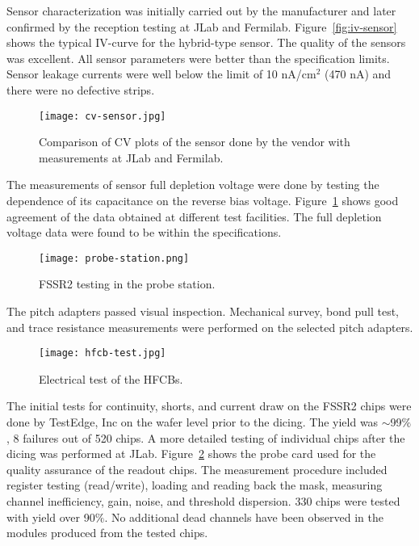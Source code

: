 Sensor characterization was initially carried out by the manufacturer and later confirmed by the reception testing at JLab and Fermilab. Figure~\ref{fig:iv-sensor} shows the typical IV-curve for the hybrid-type sensor. The quality of the sensors was excellent. All sensor parameters were better than the specification limits. Sensor leakage currents were well below the limit of 10 nA/cm$^2$ (470 nA) and there were no defective strips. 

\begin{figure}[h] 
\centering 
\texttt{[image: cv-sensor.jpg]}
\caption{Comparison of CV plots of the sensor done by the vendor with measurements at JLab and Fermilab.}
\label{fig:cv-sensor}
\end{figure}

The measurements of sensor full depletion voltage were done by testing the dependence of its capacitance on the reverse bias voltage. Figure~\ref{fig:cv-sensor} shows good agreement of the data obtained at different test facilities. The full depletion voltage data were found to be within the specifications. 

\begin{figure}[h] 
\centering 
\texttt{[image: probe-station.png]}
\caption{FSSR2 testing in the probe station.}
\label{fig:probe-station}
\end{figure}

The pitch adapters passed visual inspection. Mechanical survey, bond pull test, and trace resistance measurements were performed on the selected pitch adapters.

\begin{figure}[h] 
\centering 
\texttt{[image: hfcb-test.jpg]}
\caption{Electrical test of the HFCBs.}
\label{fig:hfcb-test}
\end{figure}

The initial tests for continuity, shorts, and current draw on the FSSR2 chips were done by TestEdge, Inc on the wafer level prior to the dicing. The yield was $\sim$99$\%$, 8 failures out of 520 chips. A more detailed testing of individual chips after the dicing was performed at JLab.  Figure~\ref{fig:probe-station} shows the probe card used for the quality assurance of the readout chips. The measurement procedure included register testing (read/write), loading and reading back the mask, measuring channel inefficiency, gain, noise, and threshold dispersion. 330 chips were tested with yield over 90$\%$. No additional dead channels have been observed in the modules produced from the tested chips.  

